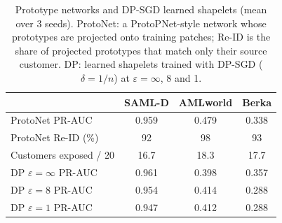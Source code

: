 \begin{table}[t]
\caption{Prototype networks and DP-SGD learned shapelets (mean over 3 seeds). ProtoNet: a ProtoPNet-style network whose prototypes are projected onto training patches; Re-ID is the share of projected prototypes that match only their source customer. DP: learned shapelets trained with DP-SGD ($\delta = 1/n$) at $\varepsilon = \infty$, 8 and 1.}
\label{tab:proto}
\small\setlength{\tabcolsep}{2.5pt}
\centering
\begin{tabular}{lccc}
\toprule
& SAML-D & AMLworld & Berka \\
\midrule
ProtoNet PR-AUC & 0.959 & 0.479 & 0.338 \\
ProtoNet Re-ID (\%) & 92 & 98 & 93 \\
Customers exposed / 20 & 16.7 & 18.3 & 17.7 \\
\midrule
DP $\varepsilon=\infty$ PR-AUC & 0.961 & 0.398 & 0.357 \\
DP $\varepsilon=8$ PR-AUC & 0.954 & 0.414 & 0.288 \\
DP $\varepsilon=1$ PR-AUC & 0.947 & 0.412 & 0.288 \\
\bottomrule\end{tabular}\end{table}
